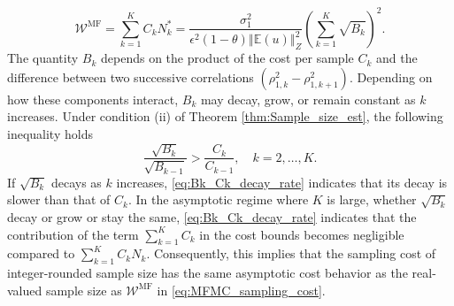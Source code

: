 %
\begin{equation*}\label{eq:MFMC_sampling_cost_2}
    \mathcal{W}^{\text{MF}} = \sum_{k=1}^K C_k N_k^* = \frac{\sigma_1^2}{\epsilon^2(1-\theta)\left\Vert\mathbb{E}(u) \right\Vert_{Z}^2}\left(\sum_{k=1}^K\sqrt{B_k} \right)^2.
\end{equation*}
%
The quantity $B_k$ depends on the product of the cost per sample $C_k$ and the difference between two successive correlations $(\rho_{1,k}^2 - \rho_{1,k+1}^2)$. Depending on how these components interact, $B_k$ may decay, grow, or remain constant as $k$ increases.
Under condition (ii) of Theorem \ref{thm:Sample_size_est}, the following inequality holds
%
\begin{equation}
\label{eq:Bk_Ck_decay_rate}
    \frac{\sqrt{B_{k}}}{\sqrt{B_{k-1}}}>\frac{C_{k}}{C_{k-1}}, \quad k=2,\ldots,K.
\end{equation}
%
If $\sqrt{B_k}$ decays as $k$ increases, \eqref{eq:Bk_Ck_decay_rate} indicates that its decay is slower than that of $C_k$. In the asymptotic regime where $K$ is large, whether $\sqrt{B_k}$ decay or grow or stay the same, \eqref{eq:Bk_Ck_decay_rate} indicates that the contribution of the term $\sum_{k=1}^K C_k$ in the cost bounds becomes negligible compared to $\sum_{k=1}^K C_kN_k$. Consequently, this implies that the sampling cost of integer-rounded sample size has the same asymptotic cost behavior as the real-valued sample size as $\mathcal{W}^\text{MF}$ in \eqref{eq:MFMC_sampling_cost}.







